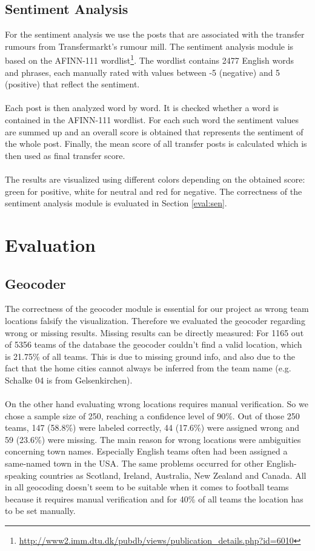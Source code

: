 \documentclass{article}
\begin{document}
\subsection{Sentiment Analysis}
\label{sentiment}
For the sentiment analysis we use the posts that are associated with the transfer rumours from Transfermarkt's rumour mill. The sentiment analysis module is based on the AFINN-111 wordlist\footnote{\url{http://www2.imm.dtu.dk/pubdb/views/publication_details.php?id=6010}}. The wordlist contains 2477 English words and phrases, each manually rated with values between -5 (negative) and 5 (positive) that reflect the sentiment. 
\\ \\
Each post is then analyzed word by word. It is checked whether a word is contained in the AFINN-111 wordlist. For each such word the sentiment values are summed up and an overall score is obtained that represents the sentiment of the whole post. Finally, the mean score of all transfer posts is calculated which is then used as final transfer score.
\\ \\
The results are visualized using different colors depending on the obtained score: green for positive, white for neutral and red for negative. The correctness of the sentiment analysis module is evaluated in Section \ref{eval:sen}.

\section{Evaluation}
\subsection{Geocoder}
\label{eval:geo}
The correctness of the geocoder module is essential for our project as wrong team locations falsify the visualization. Therefore we evaluated the geocoder regarding wrong or missing results. Missing results can be directly measured: For 1165 out of 5356 teams of the database the geocoder couldn't find a valid location, which is 21.75\% of all teams. This is due to missing ground info, and also due to the fact that the home cities cannot always be inferred from the team name (e.g. Schalke 04 is from Gelsenkirchen). 
\\ \\
On the other hand evaluating wrong locations requires manual verification. So we chose a sample size of 250, reaching a confidence level of 90\%. Out of those 250 teams, 147 (58.8\%) were labeled correctly, 44 (17.6\%) were assigned wrong and 59 (23.6\%) were missing. The main reason for wrong locations were ambiguities concerning town names. Especially English teams often had been assigned a same-named town in the USA. The same problems occurred for other English-speaking countries as Scotland, Ireland, Australia, New Zealand and Canada. All in all geocoding doesn't seem to be suitable when it comes to football teams because it requires manual verification and for 40\% of all teams the location has to be set manually.
\end{document}
